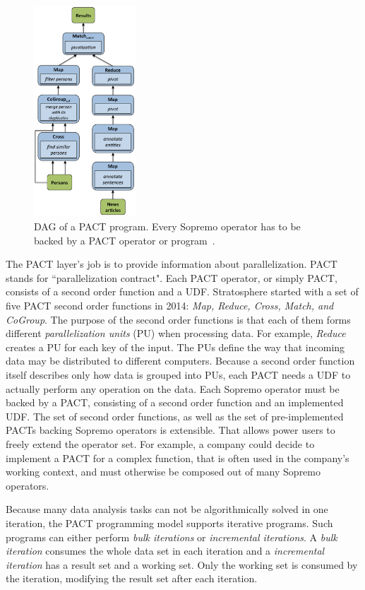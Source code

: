 \begin{figure}[!t]
\centering
\includegraphics[width=1.5in]{./img/PACTDAG.png}
\caption{DAG of a PACT program. Every Sopremo operator has to be backed by a PACT operator or program~\cite{Stratosphere2014}.}
\label{fig_pact_dag}
\end{figure}

The PACT layer's job is to provide information about parallelization. PACT stands for ``parallelization contract". Each PACT operator, or simply PACT, consists of a second order function and a UDF. Stratosphere started with a set of five PACT second order functions in 2014: \textit{Map, Reduce, Cross, Match, and CoGroup}. The purpose of the second order functions is that each of them forms different \textit{parallelization units} (PU) when processing data. For example, \textit{Reduce} creates a PU for each key of the input. The PUs define the way that incoming data may be distributed to different computers. Because a second order function itself describes only how data is grouped into PUs, each PACT needs a UDF to actually perform any operation on the data. Each Sopremo operator must be backed by a PACT, consisting of a second order function and an implemented UDF. The set of second order functions, as well as the set of pre-implemented PACTs backing Sopremo operators is extensible. That allows power users to freely extend the operator set. For example, a company could decide to implement a PACT for a complex function, that is often used in the company's working context, and must otherwise be composed out of many Sopremo operators.

Because many data analysis tasks can not be algorithmically solved in one iteration, the PACT programming model supports iterative programs. Such programs can either perform \textit{bulk iterations} or \textit{incremental iterations}. A \textit{bulk iteration} consumes the whole data set in each iteration and a \textit{incremental iteration} has a result set and a working set. Only the working set is consumed by the iteration, modifying the result set after each iteration.

